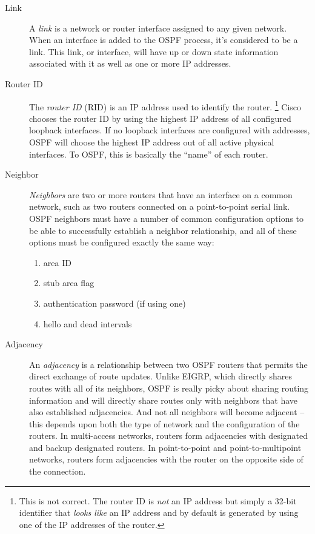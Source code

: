 \begin{description}
\item[Link]
   A \emph{link} is a network or router interface assigned to any given network.
   When an interface is added to the OSPF process, it's considered to be a link.
   This link, or interface, will have up or down state information associated with it as well as one or more IP addresses.

\item[Router ID]
   The \emph{router ID} (RID) is an IP address used to identify the router.%
      \footnote{This is not correct. The router ID is \emph{not} an IP address but simply a 32-bit identifier that \emph{looks like} an IP address and by default is generated by using one of the IP addresses of the router.}
   Cisco chooses the router ID by using the highest IP address of all configured loopback interfaces.
   If no loopback interfaces are configured with addresses, OSPF will choose the highest IP address out of all active physical interfaces.
   To OSPF, this is basically the ``name'' of each router.

\item[Neighbor]
   \emph{Neighbors} are two or more routers that have an interface on a common network, such as two routers connected on a point-to-point serial link.
   OSPF neighbors must have a number of common configuration options to be able to successfully establish a neighbor relationship,
   and all of these options must be configured exactly the same way:
   \begin{enumerate}
   \item area ID
   \item stub area flag
   \item authentication password (if using one)
   \item hello and dead intervals
   \end{enumerate}

\item[Adjacency]
   An \emph{adjacency} is a relationship between two OSPF routers that permits the direct exchange of route updates. Unlike
EIGRP, which directly shares routes with all of its neighbors, OSPF is
really picky about sharing routing information and will directly share
routes only with neighbors that have also established adjacencies. And
not all neighbors will become adjacent -- this depends upon both the type
of network and the configuration of the routers. In multi-access
networks, routers form adjacencies with designated and backup designated
routers. In point-to-point and point-to-multipoint networks, routers
form adjacencies with the router on the opposite side of the connection.


\end{description}
